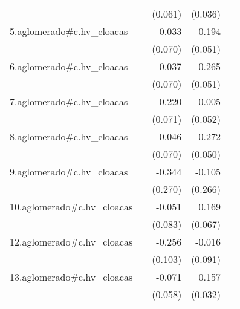 {\begin{longtable}{l*{4}{D{.}{.}{-1}}}
            &                     &     (0.061)         &     (0.036)         &                     \\
\addlinespace
5.aglomerado#c.hv\_cloacas&                     &      -0.033         &       0.194\sym{***}&                     \\
            &                     &     (0.070)         &     (0.051)         &                     \\
\addlinespace
6.aglomerado#c.hv\_cloacas&                     &       0.037         &       0.265\sym{***}&                     \\
            &                     &     (0.070)         &     (0.051)         &                     \\
\addlinespace
7.aglomerado#c.hv\_cloacas&                     &      -0.220\sym{**} &       0.005         &                     \\
            &                     &     (0.071)         &     (0.052)         &                     \\
\addlinespace
8.aglomerado#c.hv\_cloacas&                     &       0.046         &       0.272\sym{***}&                     \\
            &                     &     (0.070)         &     (0.050)         &                     \\
\addlinespace
9.aglomerado#c.hv\_cloacas&                     &      -0.344         &      -0.105         &                     \\
            &                     &     (0.270)         &     (0.266)         &                     \\
\addlinespace
10.aglomerado#c.hv\_cloacas&                     &      -0.051         &       0.169\sym{*}  &                     \\
            &                     &     (0.083)         &     (0.067)         &                     \\
\addlinespace
12.aglomerado#c.hv\_cloacas&                     &      -0.256\sym{*}  &      -0.016         &                     \\
            &                     &     (0.103)         &     (0.091)         &                     \\
\addlinespace
13.aglomerado#c.hv\_cloacas&                     &      -0.071         &       0.157\sym{***}&                     \\
            &                     &     (0.058)         &     (0.032)         &                     \\

\end{longtable}}
